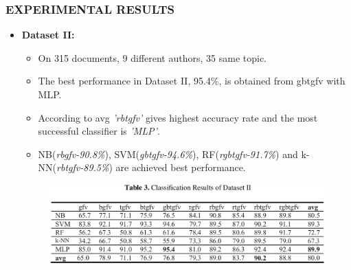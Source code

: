 \documentclass{beamer}
\begin{document}
 
 \begin{frame}
  \frametitle{EXPERIMENTAL RESULTS}
  \begin{itemize}
   \item \textbf{Dataset II:} 
	\begin{itemize}
	\item On 315 documents, 9 different authors, 35 same topic.
	\item The best performance in Dataset II, 95.4\%, is obtained from gbtgfv with MLP. 
	\item According to avg \textit{'rbtgfv'} gives highest accuracy rate and the most successful classifier is \textit{'MLP'}. 
	\item NB(\emph{rbgfv-90.8\%}), SVM(\emph{gbtgfv-94.6\%}), RF(\emph{rgbtgfv-91.7\%}) and k-NN(\emph{rbtgfv-89.5\%}) are achieved best performance.
	\end{itemize}
	
	  \begin{figure}[h]
    \begin{center}
      \includegraphics[scale=0.22]{table_3.png}
    \end{center}
   \end{figure}
  
  \end{itemize}
 \end{frame}
 
\end{document}

